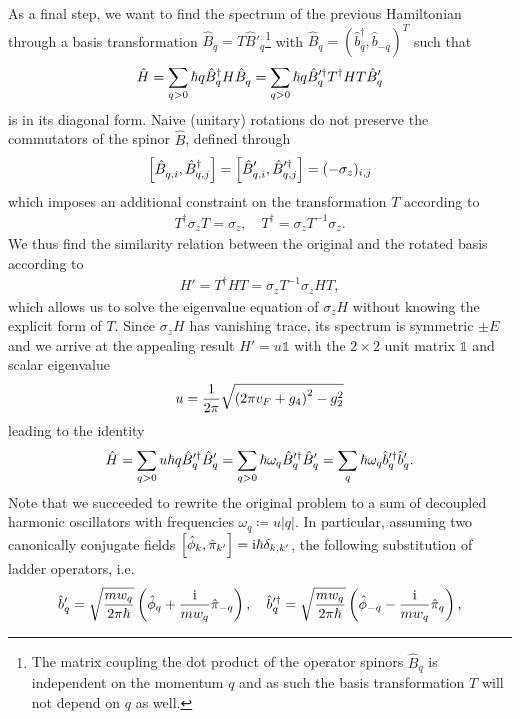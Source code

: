 As a final step, we want to find the spectrum of the previous Hamiltonian through a basis transformation $\hat B_q = T \hat B'_q$\footnote{The matrix coupling the dot product of the operator spinors $\hat B_q$ is independent on the momentum $q$ and as such the basis transformation $T$ will not depend on $q$ as well.} with $\hat B_q = (\hat b_q^\dag, \hat b_{-q})^T$ such that
\begin{align}
    \hat H = \sum_{q>0}\hbar q\hat B^\dag_q H \hat B^\pdag_q = \sum_{q>0}\hbar q\hat B'^\dag_q T^\dag H T \hat B'^\pdag_q
\end{align}
is in its diagonal form.
Naive (unitary) rotations do not preserve the commutators of the spinor $\hat B$, defined through
\begin{align}
    \commutator{\hat B_{q,i}^\pdag,\hat B^\dag_{q,j}} = \commutator{\hat B_{q,i}'^\pdag,\hat B'^\dag_{q,j}} = (-\sigma_z)_{i,j}
\end{align}
which imposes an additional constraint on the transformation $T$ according to
\begin{align}
    T^\dag\sigma_z T = \sigma_z,
    \quad
    T^\dag = \sigma_zT^{-1}\sigma_z.
\end{align}
We thus find the similarity relation between the original and the rotated basis according to
\begin{align}
    H'=T^\dag HT =\sigma_z T^{-1}\sigma_z H T,
\end{align}
which allows us to solve the eigenvalue equation of $\sigma_z H$ without knowing the explicit form of $T$.
Since $\sigma_zH$ has vanishing trace, its spectrum is symmetric $\pm E$ and we arrive at the appealing result $H' = u\mathbb1$ with the $2\times2$ unit matrix $\mathbb1$ and scalar eigenvalue
\begin{align}
    u = \frac1{2\pi}\sqrt{\left( 2\pi v_F + g_4 \right)^2 - g_2^2}
\end{align}
leading to the identity
\begin{align}
    \hat H = \sum_{q>0} u\hbar q \hat B'^\dag_q \hat B'^\pdag_q = \sum_{q>0} \hbar \omega_q \hat B'^\dag_q \hat B'^\pdag_q = \sum_q \hbar  \omega_q \hat b'^\dag_q\hat b'^\pdag_q.
\end{align}
Note that we succeeded to rewrite the original problem to a sum of decoupled harmonic oscillators with frequencies $\omega_q\coloneqq u|q|$.
In particular, assuming two canonically conjugate fields $\left[ \hat \phi_{k},\hat \pi_{k'} \right] = \mathrm i\hbar\delta_{k,k'}$, the following substitution of ladder operators, i.e.
\begin{align}
    \hat b'_q = \sqrt{\frac{mw_q}{2\pi\hbar}}\left( \hat\phi_q + \frac{\mathrm i}{mw_q}\hat\pi_{-q} \right),
    \quad
    \hat b'^\dag_q = \sqrt{\frac{mw_q}{2\pi\hbar}}\left( \hat\phi_{-q} - \frac{\mathrm i}{mw_q}\hat\pi_{q} \right),
\end{align}
